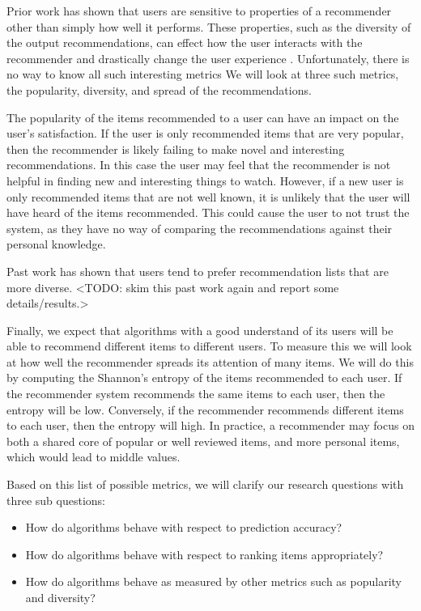 \documentclass[letterpaper]{sig-alternate}
\begin{document}
  Prior work has shown that users are sensitive to properties of a recommender other than simply how well it performs.
  These properties, such as the diversity of the output recommendations, can effect how the user interacts with the recommender and drastically change the user experience \cite{ziegler and martijn}.
  Unfortunately, there is no way to know all such interesting metrics
  We will look at three such metrics, the popularity, diversity, and spread of the recommendations.

  The popularity of the items recommended to a user can have an impact on the user's satisfaction.
  If the user is only recommended items that are very popular, then the recommender is likely failing to make novel and interesting recommendations.
  In this case the user may feel that the recommender is not helpful in finding new and interesting things to watch.
  However, if a new user is only recommended items that are not well known, it is unlikely that the user will have heard of the items recommended.
  This could cause the user to not trust the system, as they have no way of comparing the recommendations against their personal knowledge.
  

  Past work \cite{ziegler and martijn} has shown that users tend to prefer recommendation lists that are more diverse.
  <TODO: skim this past work again and report some details/results.>

  Finally, we expect that algorithms with a good understand of its users will be able to recommend different items to different users.
  To measure this we will look at how well the recommender spreads its attention of many items.
  We will do this by computing the Shannon's entropy of the items recommended to each user.
  If the recommender system recommends the same items to each user, then the entropy will be low.
  Conversely, if the recommender recommends different items to each user, then the entropy will high.
  In practice, a recommender may focus on both a shared core of popular or well reviewed items, and more personal items, which would lead to middle values.
  
  Based on this list of possible metrics, we will clarify our research questions with three sub questions:
  \begin{itemize}
  \item How do algorithms behave with respect to prediction accuracy?
  \item How do algorithms behave with respect to ranking items appropriately?
  \item How do algorithms behave as measured by other metrics such as popularity and diversity?
  \end{itemize}
\end{document}
